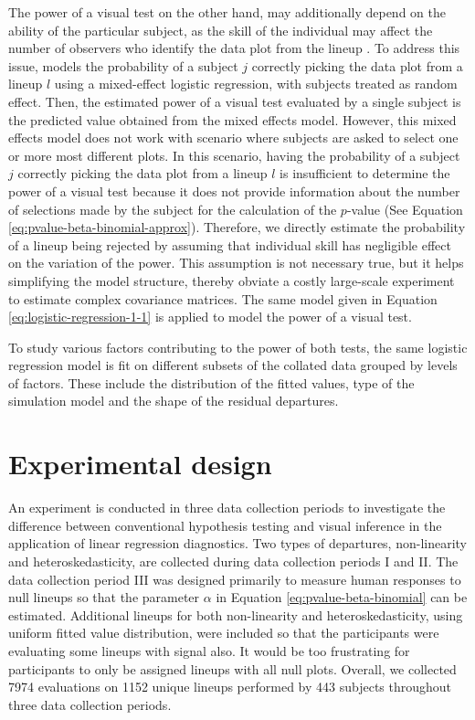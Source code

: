 \documentclass[]{interact}
\theoremstyle{plain}%
\theoremstyle{definition}
\theoremstyle{remark}
\begin{document}
The power of a visual test on the other hand, may additionally depend on
the ability of the particular subject, as the skill of the individual
may affect the number of observers who identify the data plot from the
lineup \citep{majumder_validation_2013}. To address this issue,
\citet{majumder_validation_2013} models the probability of a subject
\(j\) correctly picking the data plot from a lineup \(l\) using a
mixed-effect logistic regression, with subjects treated as random
effect. Then, the estimated power of a visual test evaluated by a single
subject is the predicted value obtained from the mixed effects model.
However, this mixed effects model does not work with scenario where
subjects are asked to select one or more most different plots. In this
scenario, having the probability of a subject \(j\) correctly picking
the data plot from a lineup \(l\) is insufficient to determine the power
of a visual test because it does not provide information about the
number of selections made by the subject for the calculation of the
\(p\)-value (See Equation \ref{eq:pvalue-beta-binomial-approx}).
Therefore, we directly estimate the probability of a lineup being
rejected by assuming that individual skill has negligible effect on the
variation of the power. This assumption is not necessary true, but it
helps simplifying the model structure, thereby obviate a costly
large-scale experiment to estimate complex covariance matrices. The same
model given in Equation \ref{eq:logistic-regression-1-1} is applied to
model the power of a visual test.

To study various factors contributing to the power of both tests, the
same logistic regression model is fit on different subsets of the
collated data grouped by levels of factors. These include the
distribution of the fitted values, type of the simulation model and the
shape of the residual departures.

\hypertarget{experimental-design}{%
\section{Experimental design}\label{experimental-design}}

An experiment is conducted in three data collection periods to
investigate the difference between conventional hypothesis testing and
visual inference in the application of linear regression diagnostics.
Two types of departures, non-linearity and heteroskedasticity, are
collected during data collection periods I and II. The data collection
period III was designed primarily to measure human responses to null
lineups so that the parameter \(\alpha\) in Equation
\ref{eq:pvalue-beta-binomial} can be estimated. Additional lineups for
both non-linearity and heteroskedasticity, using uniform fitted value
distribution, were included so that the participants were evaluating
some lineups with signal also. It would be too frustrating for
participants to only be assigned lineups with all null plots. Overall,
we collected 7974 evaluations on 1152 unique lineups performed by 443
subjects throughout three data collection periods.
\end{document}
